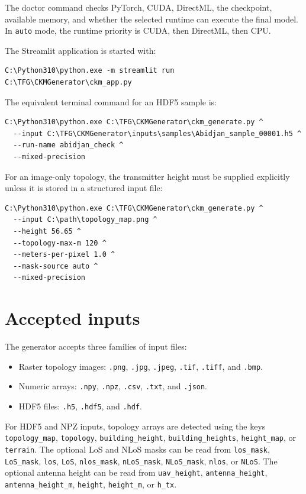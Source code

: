 The doctor command checks PyTorch, CUDA, DirectML, the checkpoint, available
memory, and whether the selected runtime can execute the final model. In
\texttt{auto} mode, the runtime priority is CUDA, then DirectML, then CPU.

The Streamlit application is started with:

{\scriptsize
\begin{verbatim}
C:\Python310\python.exe -m streamlit run C:\TFG\CKMGenerator\ckm_app.py
\end{verbatim}
}

The equivalent terminal command for an HDF5 sample is:

{\scriptsize
\begin{verbatim}
C:\Python310\python.exe C:\TFG\CKMGenerator\ckm_generate.py ^
  --input C:\TFG\CKMGenerator\inputs\samples\Abidjan_sample_00001.h5 ^
  --run-name abidjan_check ^
  --mixed-precision
\end{verbatim}
}

For an image-only topology, the transmitter height must be supplied explicitly
unless it is stored in a structured input file:

{\scriptsize
\begin{verbatim}
C:\Python310\python.exe C:\TFG\CKMGenerator\ckm_generate.py ^
  --input C:\path\topology_map.png ^
  --height 56.65 ^
  --topology-max-m 120 ^
  --meters-per-pixel 1.0 ^
  --mask-source auto ^
  --mixed-precision
\end{verbatim}
}

\section{Accepted inputs}

The generator accepts three families of input files:

\begin{itemize}
\setlength\itemsep{0.15em}
  \item Raster topology images: \texttt{.png}, \texttt{.jpg},
        \texttt{.jpeg}, \texttt{.tif}, \texttt{.tiff}, and \texttt{.bmp}.
  \item Numeric arrays: \texttt{.npy}, \texttt{.npz}, \texttt{.csv},
        \texttt{.txt}, and \texttt{.json}.
  \item HDF5 files: \texttt{.h5}, \texttt{.hdf5}, and \texttt{.hdf}.
\end{itemize}

For HDF5 and NPZ inputs, topology arrays are detected using the keys
\texttt{topology\_map}, \texttt{topology}, \texttt{building\_height},
\texttt{building\_heights}, \texttt{height\_map}, or \texttt{terrain}.
The optional LoS and NLoS masks can be read from \texttt{los\_mask},
\texttt{LoS\_mask}, \texttt{los}, \texttt{LoS}, \texttt{nlos\_mask},
\texttt{nLoS\_mask}, \texttt{NLoS\_mask}, \texttt{nlos}, or
\texttt{NLoS}. The optional antenna height can be read from
\texttt{uav\_height}, \texttt{antenna\_height},
\texttt{antenna\_height\_m}, \texttt{height}, \texttt{height\_m}, or
\texttt{h\_tx}.

